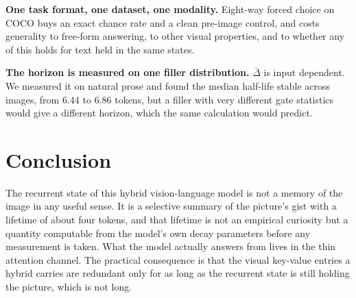 \documentclass[11pt]{article}
\begin{document}
\textbf{One task format, one dataset, one modality.} Eight-way forced choice on
COCO buys an exact chance rate and a clean pre-image control, and costs
generality to free-form answering, to other visual properties, and to whether
any of this holds for text held in the same states.

\textbf{The horizon is measured on one filler distribution.} $\bar{\Delta}$ is
input dependent. We measured it on natural prose and found the median half-life
stable across images, from $6.44$ to $6.86$ tokens, but a filler with very
different gate statistics would give a different horizon, which the same
calculation would predict.
\section{Conclusion}

The recurrent state of this hybrid vision-language model is not a memory of the
image in any useful sense. It is a selective summary of the picture's gist with
a lifetime of about four tokens, and that lifetime is not an empirical curiosity
but a quantity computable from the model's own decay parameters before any
measurement is taken. What the model actually answers from lives in the thin
attention channel. The practical consequence is that the visual key-value
entries a hybrid carries are redundant only for as long as the recurrent state
is still holding the picture, which is not long.
\end{document}
